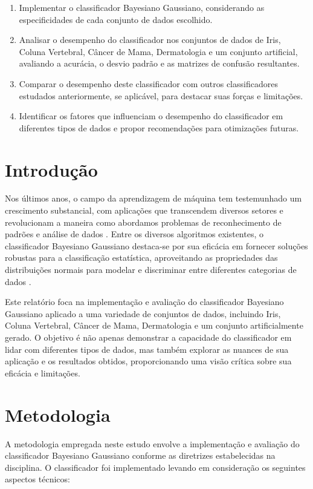 \documentclass[12pt, a4paper]{report}
\begin{document}
\begin{enumerate}
    \item Implementar o classificador Bayesiano Gaussiano, considerando as especificidades de cada conjunto de dados escolhido.
    \item Analisar o desempenho do classificador nos conjuntos de dados de Iris, Coluna Vertebral, Câncer de Mama, Dermatologia e um conjunto artificial, avaliando a acurácia, o desvio padrão e as matrizes de confusão resultantes.
    \item Comparar o desempenho deste classificador com outros classificadores estudados anteriormente, se aplicável, para destacar suas forças e limitações.
    \item Identificar os fatores que influenciam o desempenho do classificador em diferentes tipos de dados e propor recomendações para otimizações futuras.
\end{enumerate}

\chapter{Introdução}

Nos últimos anos, o campo da aprendizagem de máquina tem testemunhado um crescimento substancial, com aplicações que transcendem diversos setores e revolucionam a maneira como abordamos problemas de reconhecimento de padrões e análise de dados \cite{bishop2006pattern}. Entre os diversos algoritmos existentes, o classificador Bayesiano Gaussiano destaca-se por sua eficácia em fornecer soluções robustas para a classificação estatística, aproveitando as propriedades das distribuições normais para modelar e discriminar entre diferentes categorias de dados \cite{murphy2012machine}.

Este relatório foca na implementação e avaliação do classificador Bayesiano Gaussiano aplicado a uma variedade de conjuntos de dados, incluindo Iris, Coluna Vertebral, Câncer de Mama, Dermatologia e um conjunto artificialmente gerado. O objetivo é não apenas demonstrar a capacidade do classificador em lidar com diferentes tipos de dados, mas também explorar as nuances de sua aplicação e os resultados obtidos, proporcionando uma visão crítica sobre sua eficácia e limitações.

\chapter{Metodologia}

A metodologia empregada neste estudo envolve a implementação e avaliação do classificador Bayesiano Gaussiano conforme as diretrizes estabelecidas na disciplina. O classificador foi implementado levando em consideração os seguintes aspectos técnicos:
\end{document}
